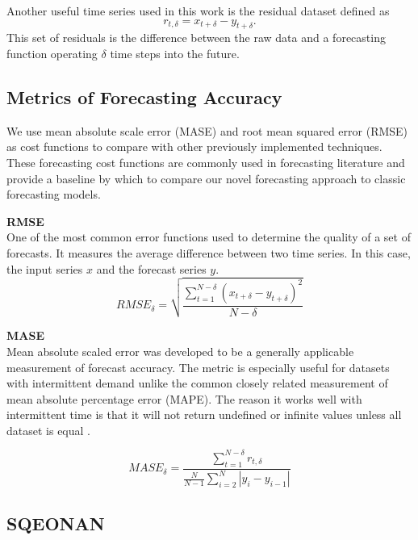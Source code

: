 \documentclass{sig-alternate}
\begin{document}
Another useful time series used in this work is the residual dataset defined as
\begin{equation}
r_{t,\delta} =  x_{t + \delta} - y_{t + \delta}.
\end{equation}
This set of residuals is the difference between the raw data and a forecasting function operating $\delta$ time steps into the future. 

\subsection{Metrics of Forecasting Accuracy}
We use mean absolute scale error (MASE) \cite{Hyndman2006} and root mean squared error (RMSE) as cost functions to compare with other previously implemented techniques.  These forecasting cost functions are commonly used in forecasting literature and provide a baseline by which to compare our novel forecasting approach to classic forecasting models.  

\bigskip
\noindent \textbf{RMSE} \\
One of the most common error functions used to determine the quality of a set of forecasts.  It measures the average difference between two time series.  In this case, the input series $x$ and the forecast series $y$.
\begin{equation}
RMSE_{\delta} = \sqrt{\frac{\sum_{t = 1}^{N - \delta}{(x_{t + \delta} - y_{t + \delta})^{2}}}{N - \delta}}
\end{equation}

\bigskip
\noindent \textbf{MASE} \\
Mean absolute scaled error was developed to be a generally applicable measurement of forecast accuracy.  The metric is especially useful for datasets with intermittent demand unlike the common closely related measurement of mean absolute percentage error (MAPE).  The reason it works well with intermittent time is that it will not return undefined or infinite values unless all dataset is equal \cite{Hyndman2008}.

\begin{equation}
MASE_{\delta} = \frac{\sum_{t = 1}^{N - \delta}{r_{t, \delta}}}{\frac{N}{N - 1}\sum_{i = 2}^{N}|y_{i} - y_{i - 1}|}
\end{equation}
\subsection{SQEONAN}
\end{document}
